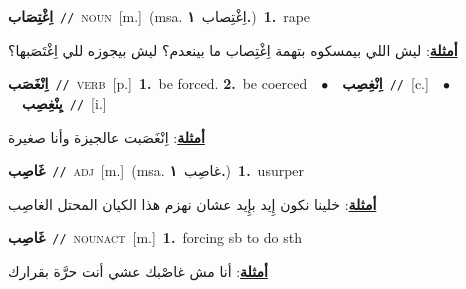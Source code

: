 \documentclass[10pt,a4paper,twoside]{article} %
\begin{document}
\begin{multicols}{2}
{\setlength\topsep{0pt}\textbf{\foreignlanguage{arabic}{اِغْتِصَاب}}\ {\color{gray}\texttt{//}\color{black}}\ \textsc{noun}\ [m.]\ \color{gray}(msa. \foreignlanguage{arabic}{اِغْتِصاب}~\foreignlanguage{arabic}{\textbf{١.}})\color{black}\ \textbf{1.}~rape\  \begin{flushright}\color{gray}\foreignlanguage{arabic}{\textbf{\underline{\foreignlanguage{arabic}{أمثلة}}}: ليش اللي بيمسكوه بتهمة اِغْتِصاب ما بينعدم؟ ليش بيجوزه للي اِغْتَصَبها؟}\end{flushright}\color{black}} \vspace{2mm}

{\setlength\topsep{0pt}\textbf{\foreignlanguage{arabic}{اِنْغَصَب}}\ {\color{gray}\texttt{//}\color{black}}\ \textsc{verb}\ [p.]\ \textbf{1.}~be forced.  \textbf{2.}~be coerced\ \ $\bullet$\ \ \setlength\topsep{0pt}\textbf{\foreignlanguage{arabic}{اِنْغِصِب}}\ {\color{gray}\texttt{//}\color{black}}\ [c.]\ \ $\bullet$\ \ \setlength\topsep{0pt}\textbf{\foreignlanguage{arabic}{يِنْغِصِب}}\ {\color{gray}\texttt{//}\color{black}}\ [i.]\  \begin{flushright}\color{gray}\foreignlanguage{arabic}{\textbf{\underline{\foreignlanguage{arabic}{أمثلة}}}: اِنْغَصَبت عالجيزة وأنا صغيرة}\end{flushright}\color{black}} \vspace{2mm}

{\setlength\topsep{0pt}\textbf{\foreignlanguage{arabic}{غَاصِب}}\ {\color{gray}\texttt{//}\color{black}}\ \textsc{adj}\ [m.]\ \color{gray}(msa. \foreignlanguage{arabic}{غاصِب}~\foreignlanguage{arabic}{\textbf{١.}})\color{black}\ \textbf{1.}~usurper\  \begin{flushright}\color{gray}\foreignlanguage{arabic}{\textbf{\underline{\foreignlanguage{arabic}{أمثلة}}}: خلينا نكون إِيد بإِيد عشان نهزم هذا الكيان المحتل الغاصِب}\end{flushright}\color{black}} \vspace{2mm}

{\setlength\topsep{0pt}\textbf{\foreignlanguage{arabic}{غَاصِب}}\ {\color{gray}\texttt{//}\color{black}}\ \textsc{noun\textunderscore act}\ [m.]\ \textbf{1.}~forcing sb to do sth\  \begin{flushright}\color{gray}\foreignlanguage{arabic}{\textbf{\underline{\foreignlanguage{arabic}{أمثلة}}}: أنا مش غاصْبك عشي أنت حرَّة بقرارك}\end{flushright}\color{black}} \vspace{2mm}


\end{multicols}
\end{document}
